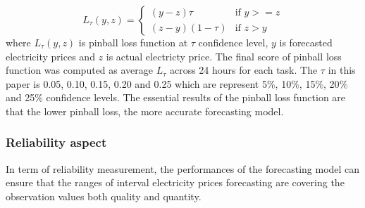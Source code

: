 \documentclass[review]{elsarticle}
\begin{document}
          \begin{equation}
            L_{\tau}(y,z) =
            \begin{cases}
              (y-z)\tau & \text{if  $y>=z$} \\
              (z-y)(1-\tau) & \text{if  $z>y$}
            \end{cases}
            \label{eq.pinball}
          \end{equation}
          where $L_{\tau}(y,z)$ is pinball loss function at $\tau$ confidence level, $y$ is forecasted electricity prices and $z$ is actual electricty price.
          The final score of pinball loss function was computed as average $L_{\tau}$ across 24 hours for each task.
          The $\tau$ in this paper is 0.05, 0.10, 0.15, 0.20 and 0.25 which are represent 5$\%$, 10$\%$, 15$\%$, 20$\%$ and 25$\%$ confidence levels.
          The essential results of the pinball loss function are that the lower pinball loss, the more accurate forecasting model.

        \subsubsection{Reliability aspect}
        In term of reliability measurement, the performances of the forecasting model can ensure that the ranges of interval electricity prices forecasting are covering the observation values both quality and quantity.
\end{document}
